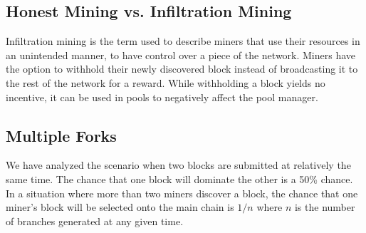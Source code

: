 \documentclass[runningheads]{llncs}
\begin{document}


\subsection{Honest Mining vs. Infiltration Mining}
Infiltration mining is the term used to describe miners that use their resources in an unintended manner, to have control over a piece of the network. Miners have the option to withhold their newly discovered block instead of broadcasting it to the rest of the network for a reward. While withholding a block yields no incentive, it can be used in pools to negatively affect the pool manager.


\subsection{Multiple Forks}
We have analyzed the scenario when two blocks are submitted at relatively the same time. The chance that one block will dominate the other is a 50\% chance. In a situation where more than two miners discover a block, the chance that one miner's block will be selected onto the main chain is $1/n$ where $n$ is the number of branches generated at any given time.

\end{document}

